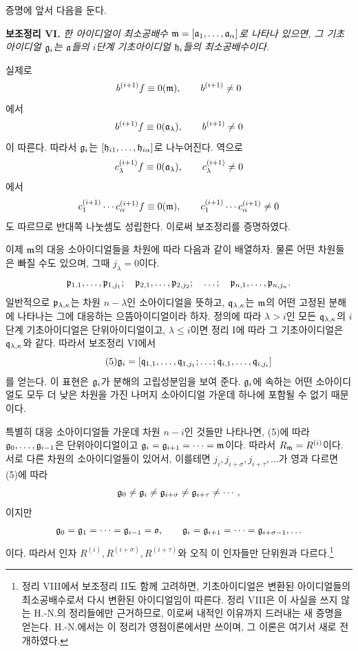 증명에 앞서 다음을 둔다.

\textbf{보조정리 VI.} \emph{한 아이디얼이 최소공배수 \(\mathfrak m=[\mathfrak a_1,\ldots,\mathfrak a_\alpha]\)로 나타나 있으면, 그 기초아이디얼 \(\mathfrak g_i\)는 \(\mathfrak a\)들의 \(i\)단계 기초아이디얼 \(\mathfrak h_i\)들의 최소공배수이다.}

실제로
\[
 b^{(i+1)}f\equiv0(\mathfrak m),\qquad b^{(i+1)}\ne0
\]
에서
\[
 b^{(i+1)}f\equiv0(\mathfrak a_\lambda),\qquad b^{(i+1)}\ne0
\]
이 따른다. 따라서 \(\mathfrak g_i\)는 \([\mathfrak h_{i1},\ldots,\mathfrak h_{i\alpha}]\)로 나누어진다. 역으로
\[
 c_\lambda^{(i+1)}f\equiv0(\mathfrak a_\lambda),\qquad c_\lambda^{(i+1)}\ne0
\]
에서
\[
 c_1^{(i+1)}\cdots c_\alpha^{(i+1)}f\equiv0(\mathfrak m),\qquad
 c_1^{(i+1)}\cdots c_\alpha^{(i+1)}\ne0
\]
도 따르므로 반대쪽 나눗셈도 성립한다. 이로써 보조정리를 증명하였다.

이제 \(\mathfrak m\)의 대응 소아이디얼들을 차원에 따라 다음과 같이 배열하자. 물론 어떤 차원들은 빠질 수도 있으며, 그때 \(j_\lambda=0\)이다.
\[
 \mathfrak p_{1,1},\ldots,\mathfrak p_{1,j_1};\quad
 \mathfrak p_{2,1},\ldots,\mathfrak p_{2,j_2};\quad\ldots;\quad
 \mathfrak p_{n,1},\ldots,\mathfrak p_{n,j_n}.
\]
일반적으로 \(\mathfrak p_{\lambda,\kappa}\)는 차원 \(n-\lambda\)인 소아이디얼을 뜻하고, \(\mathfrak q_{\lambda,\kappa}\)는 \(\mathfrak m\)의 어떤 고정된 분해에 나타나는 그에 대응하는 으뜸아이디얼이라 하자. 정의에 따라 \(\lambda>i\)인 모든 \(\mathfrak q_{\lambda,\kappa}\)의 \(i\)단계 기초아이디얼은 단위아이디얼이고, \(\lambda\leq i\)이면 정리 I에 따라 그 기초아이디얼은 \(\mathfrak q_{\lambda,\kappa}\)와 같다. 따라서 보조정리 VI에서
\[
 \tag{5}
 \mathfrak g_i=[\mathfrak q_{1,1},\ldots,\mathfrak q_{1,j_1};\ldots;\mathfrak q_{i,1},\ldots,\mathfrak q_{i,j_i}]
\]
를 얻는다. 이 표현은 \(\mathfrak g_i\)가 분해의 고립성분임을 보여 준다. \(\mathfrak g_i\)에 속하는 어떤 소아이디얼도 모두 더 낮은 차원을 가진 나머지 소아이디얼 가운데 하나에 포함될 수 없기 때문이다.

특별히 대응 소아이디얼들 가운데 차원 \(n-i\)인 것들만 나타나면, (5)에 따라 \(\mathfrak g_0,\ldots,\mathfrak g_{i-1}\)은 단위아이디얼이고 \(\mathfrak g_i=\mathfrak g_{i+1}=\cdots=\mathfrak m\)이다. 따라서 \(R_\mathfrak m=R^{(i)}\)이다. 서로 다른 차원의 소아이디얼들이 있어서, 이를테면 \(j_i,j_{i+\sigma},j_{i+\tau},\ldots\)가 영과 다르면 (5)에 따라
\[
 \mathfrak g_0\ne\mathfrak g_i\ne\mathfrak g_{i+\sigma}\ne\mathfrak g_{i+\tau}\ne\cdots,
\]
이지만
\[
 \mathfrak g_0=\mathfrak g_1=\cdots=\mathfrak g_{i-1}=\mathfrak o,
 \qquad
 \mathfrak g_i=\mathfrak g_{i+1}=\cdots=\mathfrak g_{i+\sigma-1},\ldots
\]
이다. 따라서 인자 \(R^{(i)},R^{(i+\sigma)},R^{(i+\tau)}\)와 오직 이 인자들만 단위원과 다르다.\footnote{정리 VIII에서 보조정리 II도 함께 고려하면, 기초아이디얼은 변환된 아이디얼들의 최소공배수로서 다시 변환된 아이디얼임이 따른다. 정리 VIII은 이 사실을 쓰지 않는 H.-N.의 정리들에만 근거하므로, 이로써 내적인 이유까지 드러내는 새 증명을 얻는다. H.-N.에서는 이 정리가 영점이론에서만 쓰이며, 그 이론은 여기서 새로 전개하였다.}

